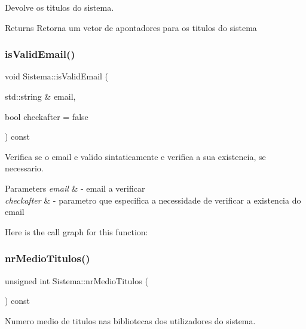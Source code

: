 Devolve os titulos do sistema. 

\begin{DoxyReturn}{Returns}
Retorna um vetor de apontadores para os titulos do sistema 
\end{DoxyReturn}
\mbox{\label{class_sistema_ac120f4aecf81933be110233f8dbf74c6}} 
\subsubsection{\texorpdfstring{is\+Valid\+Email()}{isValidEmail()}}
{\footnotesize\ttfamily void Sistema\+::is\+Valid\+Email (\begin{DoxyParamCaption}\item[{std\+::string \&}]{email,  }\item[{bool}]{checkafter = {\ttfamily false} }\end{DoxyParamCaption}) const}



Verifica se o email e valido sintaticamente e verifica a sua existencia, se necessario. 


\begin{DoxyParams}{Parameters}
{\em email} & -\/ email a verificar \\
\hline
{\em checkafter} & -\/ parametro que especifica a necessidade de verificar a existencia do email \\
\hline
\end{DoxyParams}
Here is the call graph for this function\+:
\mbox{\label{class_sistema_a588450a81753c22b0454580fde17a7a7}} 
\subsubsection{\texorpdfstring{nr\+Medio\+Titulos()}{nrMedioTitulos()}}
{\footnotesize\ttfamily unsigned int Sistema\+::nr\+Medio\+Titulos (\begin{DoxyParamCaption}{ }\end{DoxyParamCaption}) const}



Numero medio de titulos nas bibliotecas dos utilizadores do sistema. 

